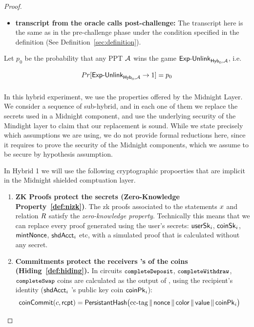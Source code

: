 \begin{proof}
\begin{itemize} [label=$\blacksquare$]
\begin{CktBox}{trn:withdrawchal}{Transcript for the $\Withdraw$ flow for user $\candB$}
\begin{OutList}
\end{OutList}
\end{CktBox}


 \item\textbf{transcript from the oracle calls post-challenge:}
    The transcript here is the same as in the pre-challenge phase under the condition specified in the definition (See Definition~\ref{sec:definition}).
\end{itemize}


Let $p_0$ be the probability that any PPT  $\mathcal{A}$ wins the game $\mathsf{Exp\text{-}Unlink}_{\mathsf{Hyb}_{0},\mathcal{A}}$, i.e.


$$Pr[\mathsf{Exp\text{-}Unlink}_{\mathsf{Hyb}_{0},\mathcal{A}} \rightarrow 1] =p_0$$

\subsubsection{\texorpdfstring{}{Hybrid 1 - Midnight Shielded Computation and Shielded Coin Layer and}}

In this hybrid experiment, we use the properties offered by the Midnight Layer.
We consider a sequence of sub-hybrid, and in each one of them we replace the secrets used in a Midnight component, and use
the underlying security of the Mindight layer to claim that
our replacement is sound.
While we state precisely which assumptions we are using, we
do not provide formal reductions here, since it requires to prove the security of the Midnight components, which we assume to be secure by hypothesis assumption.


In Hybrid 1  we will use the following cryptographic propoerties that are implicit in the Midnight shielded comptuation layer.

\begin{enumerate}
    \item \textbf{ZK Proofs protect the secrets (Zero-Knowledge Property~\ref{def:nizk})}. The zk proofs associated to the statements  $x$ and relation $R$ satisfy the \emph{zero-knowledge property}. Technically this means that we can replace every proof  generated using the user's secrets: $\mathsf{userSk}_i$, $\mathsf{coinSk}_i$, $\mathsf{mintNonce}$, $\mathsf{shdAcct}_i$ etc, with a simulated proof  that is calculated without any secret.

    \item \textbf{Commitments protect the receivers 's of the coins (Hiding~\ref{def:hiding}).} In circuits
    $\texttt{\small completeDeposit}$, $\texttt{\small completeWithdraw}$, $\texttt{\small completeSwap}$ coins are calculated as the output of
    \MidNoteT{$\opMint$},   using the recipient's identity ($\mathsf{shdAcct}_i$ 's public key coin $\mathsf{coinPk}_i$):
    \begin{align*}
    {\mathsf{coinCommit}(c, \mathsf{rcpt})} &= \mathsf{PersistantHash}\bigl(\text{cc-tag} \,\|\, \mathsf{nonce} \,\|\,
  \mathsf{color} \,\|\, \mathsf{value} \,\|\, \mathsf{coinPk}_i\bigr)
\end{align*}


\end{enumerate}
\end{proof}
